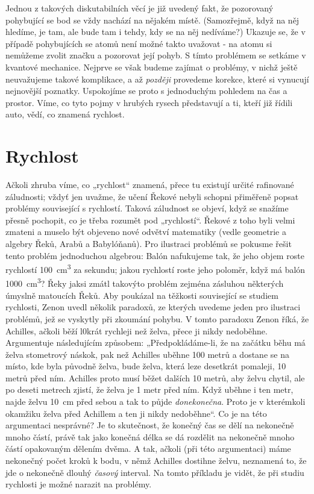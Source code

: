     Jednou z takových diskutabilních věcí je již uvedený fakt, že pozorovaný pohybující se bod se 
    vždy nachází na nějakém místě. (Samozřejmě, když na něj hledíme, je tam, ale bude tam i tehdy, 
    kdy se na něj nedíváme?) Ukazuje se, že v případě pohybujících se atomů není možné takto 
    uvažovat - na atomu si nemůžeme zvolit značku a pozorovat její pohyb. S tímto problémem se 
    setkáme v kvantové mechanice. Nejprve se však budeme zajímat o problémy, v nichž ještě 
    neuvažujeme takové komplikace, a až \emph{později} provedeme korekce, které si vynucují 
    nejnovější poznatky. Uspokojíme se proto s jednoduchým pohledem na čas a prostor. Víme, co tyto 
    pojmy v hrubých rysech představují a ti, kteří již řídili auto, vědí, co znamená rychlost.
    
  \section{Rychlost}
    Ačkoli zhruba víme, co „rychlost“ znamená, přece tu existují určité rafinované záludnosti; 
    vždyť jen uvažme, že učení Řekové nebyli schopni přiměřeně popsat problémy související s 
    rychlostí. Taková záludnost se objeví, když se snažíme přesně pochopit, co je třeba rozumět pod 
    „rychlostí“. Řekové z toho byli velmi zmateni a muselo být objeveno nové odvětví matematiky 
    (vedle geometrie a algebry Řeků, Arabů a Babylóňanů). Pro ilustraci problémů se pokusme řešit 
    tento problém jednoduchou algebrou: Balón nafukujeme tak, že jeho objem roste rychlostí 
    \SI{100}{\cubic\cm} za sekundu; jakou rychlostí roste jeho poloměr, když má balón 
    \SI{1000}{\cubic\cm}? Řeky jaksi zmátl takovýto problém zejména zásluhou některých úmyslně 
    matoucích Řeků. Aby poukázal na těžkosti související se studiem rychlosti, Zenon uvedl několik 
    paradoxů, ze kterých uvedeme jeden pro ilustraci problémů, jež se vyskytly při zkoumání pohybu. 
    V tomto paradoxu Zenon říká, že Achilles, ačkoli běží l0krát rychleji než želva, přece ji nikdy 
    nedoběhne. Argumentuje následujícím způsobem: „Předpokládáme-li, že na začátku běhu má želva 
    stometrový náskok, pak než Achilles uběhne \num{100} metrů a dostane se na místo, kde byla 
    původně želva, bude želva, která leze desetkrát pomaleji, \num{10} metrů před ním. Achilles 
    proto musí běžet dalších \num{10} metrů, aby želvu chytil, ale po deseti metrech zjistí, že 
    želva je \num{1} metr před ním. Když uběhne i ten metr, najde želvu \SI{10}{\cm} před sebou a 
    tak to půjde \emph{donekonečna}. Proto je v kterémkoli okamžiku želva před Achillem a ten ji 
    nikdy nedoběhne“. Co je na této argumentaci nesprávné? Je to skutečnost, že konečný čas se dělí 
    na nekonečně mnoho částí, právě tak jako konečná délka se dá rozdělit na nekonečně mnoho částí 
    opakovaným dělením dvěma. A tak, ačkoli (při této argumentaci) máme nekonečný počet kroků k 
    bodu, v němž Achilles dostihne želvu, neznamená to, že jde o nekonečně dlouhý \emph{časový} 
    interval. Na tomto příkladu je vidět, že při studiu rychlosti je možné narazit na problémy.
    
